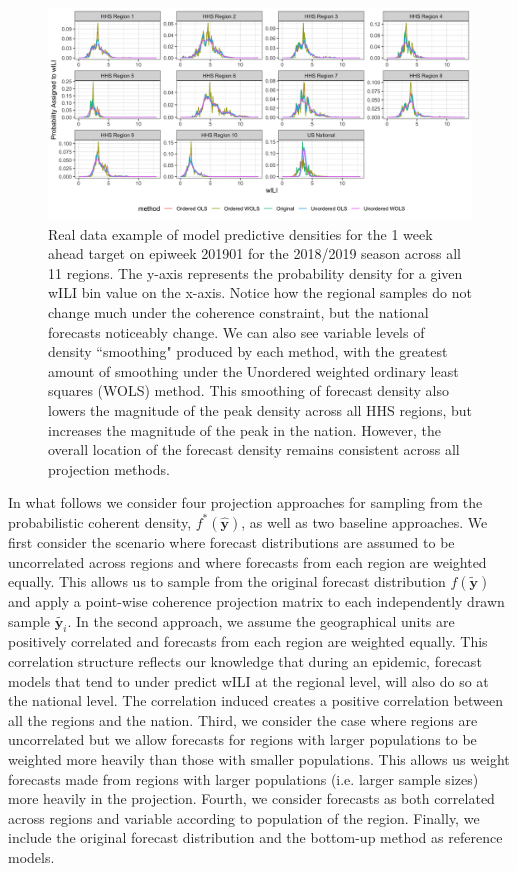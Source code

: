 \documentclass{umassthesis}          %
\begin{document}
\begin{figure}
    \centering
    \includegraphics[scale=.175]{fig_5.png}
    \caption{ Real data example of model predictive densities for the 1 week ahead target on epiweek 201901 for the 2018/2019 season across all 11 regions. The y-axis represents the probability density for a given wILI bin value on the x-axis. Notice how the regional samples do not change much under the coherence constraint, but the national forecasts noticeably change. We can also see variable levels of density ``smoothing" produced by each method, with the greatest amount of smoothing under the Unordered weighted ordinary least squares (WOLS) method. This smoothing of forecast density also lowers the magnitude of the peak density across all HHS regions, but increases the magnitude of the peak in the nation. However, the overall location of the forecast density remains consistent across all projection methods.  }
    \label{fig:pcc_example}
\end{figure}




In what follows we consider four projection approaches for sampling from the probabilistic coherent density, $f^*(\hat{\bm{y}})$, as well as two baseline approaches. We first consider the scenario where forecast distributions are assumed to be uncorrelated across regions and where forecasts from each region are weighted equally. This allows us to sample from the original forecast distribution $f(\tilde{\bm{y}})$ and apply a point-wise coherence projection matrix to each independently drawn sample $\tilde{\bm{y}_i}$. In the second approach, we assume the geographical units are positively correlated and forecasts from each region are weighted equally. This correlation structure reflects our knowledge that during an epidemic, forecast models that tend to under predict wILI at the regional level, will also do so at the national level. The correlation induced creates a positive correlation between all the regions and the nation. Third, we consider the case where regions are uncorrelated but we allow forecasts for regions with larger populations to be weighted more heavily than those with smaller populations. This allows us weight forecasts made from regions with larger populations (i.e. larger sample sizes) more heavily in the projection. Fourth, we consider forecasts as both correlated across regions and variable according to population of the region. Finally, we include the original forecast distribution and the bottom-up method as reference models. 
\end{document}
